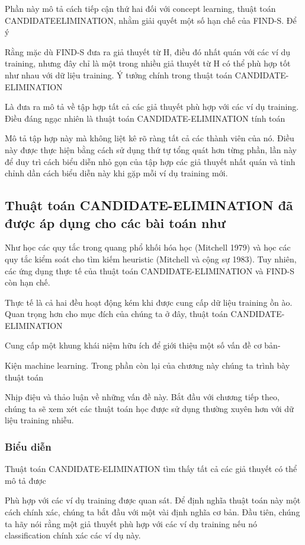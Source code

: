 Phần này mô tả cách tiếp cận thứ hai đối với concept learning, thuật toán CANDIDATEELIMINATION, nhằm giải quyết một số hạn chế của FIND-S. Để ý

Rằng mặc dù FIND-S đưa ra giả thuyết từ H, điều đó nhất quán với các ví dụ training, nhưng đây chỉ là một trong nhiều giả thuyết từ H có thể phù hợp tốt như nhau với dữ liệu training. Ý tưởng chính trong thuật toán CANDIDATE-ELIMINATION

Là đưa ra mô tả về tập hợp tất cả các giả thuyết phù hợp với các ví dụ training. Điều đáng ngạc nhiên là thuật toán CANDIDATE-ELIMINATION tính toán

Mô tả tập hợp này mà không liệt kê rõ ràng tất cả các thành viên của nó. Điều này được thực hiện bằng cách sử dụng thứ tự tổng quát hơn từng phần, lần này để duy trì cách biểu diễn nhỏ gọn của tập hợp các giả thuyết nhất quán và tinh chỉnh dần cách biểu diễn này khi gặp mỗi ví dụ training mới.

\subsection{Thuật toán CANDIDATE-ELIMINATION đã được áp dụng cho các bài toán như}

Như học các quy tắc trong quang phổ khối hóa học (Mitchell 1979) và học các quy tắc kiểm soát cho tìm kiếm heuristic (Mitchell và cộng sự 1983). Tuy nhiên, các ứng dụng thực tế của thuật toán CANDIDATE-ELIMINATION và FIND-S còn hạn chế.

Thực tế là cả hai đều hoạt động kém khi được cung cấp dữ liệu training ồn ào. Quan trọng hơn cho mục đích của chúng ta ở đây, thuật toán CANDIDATE-ELIMINATION

Cung cấp một khung khái niệm hữu ích để giới thiệu một số vấn đề cơ bản-

Kiện machine learning. Trong phần còn lại của chương này chúng ta trình bày thuật toán

Nhịp điệu và thảo luận về những vấn đề này. Bắt đầu với chương tiếp theo, chúng ta sẽ xem xét các thuật toán học được sử dụng thường xuyên hơn với dữ liệu training nhiễu.

\subsubsection{Biểu diễn}

Thuật toán CANDIDATE-ELIMINATION tìm thấy tất cả các giả thuyết có thể mô tả được

Phù hợp với các ví dụ training được quan sát. Để định nghĩa thuật toán này một cách chính xác, chúng ta bắt đầu với một vài định nghĩa cơ bản. Đầu tiên, chúng ta hãy nói rằng một giả thuyết phù hợp với các ví dụ training nếu nó classification chính xác các ví dụ này.

